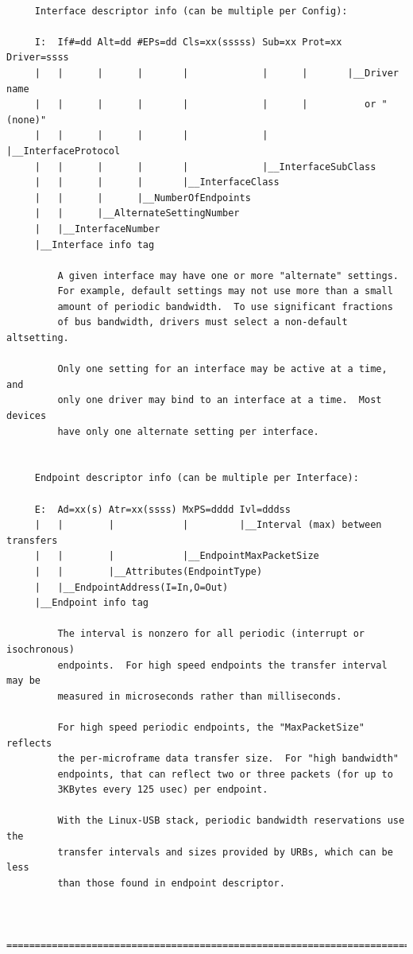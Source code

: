 \begin{verbatim}
     
     Interface descriptor info (can be multiple per Config):
     
     I:  If#=dd Alt=dd #EPs=dd Cls=xx(sssss) Sub=xx Prot=xx Driver=ssss
     |   |      |      |       |             |      |       |__Driver name
     |   |      |      |       |             |      |          or "(none)"
     |   |      |      |       |             |      |__InterfaceProtocol
     |   |      |      |       |             |__InterfaceSubClass
     |   |      |      |       |__InterfaceClass
     |   |      |      |__NumberOfEndpoints
     |   |      |__AlternateSettingNumber
     |   |__InterfaceNumber
     |__Interface info tag
     
         A given interface may have one or more "alternate" settings.
         For example, default settings may not use more than a small
         amount of periodic bandwidth.  To use significant fractions
         of bus bandwidth, drivers must select a non-default altsetting.
     
         Only one setting for an interface may be active at a time, and
         only one driver may bind to an interface at a time.  Most devices
         have only one alternate setting per interface.
     
     
     Endpoint descriptor info (can be multiple per Interface):
     
     E:  Ad=xx(s) Atr=xx(ssss) MxPS=dddd Ivl=dddss
     |   |        |            |         |__Interval (max) between transfers
     |   |        |            |__EndpointMaxPacketSize
     |   |        |__Attributes(EndpointType)
     |   |__EndpointAddress(I=In,O=Out)
     |__Endpoint info tag
     
         The interval is nonzero for all periodic (interrupt or isochronous)
         endpoints.  For high speed endpoints the transfer interval may be
         measured in microseconds rather than milliseconds.
     
         For high speed periodic endpoints, the "MaxPacketSize" reflects
         the per-microframe data transfer size.  For "high bandwidth"
         endpoints, that can reflect two or three packets (for up to
         3KBytes every 125 usec) per endpoint.
     
         With the Linux-USB stack, periodic bandwidth reservations use the
         transfer intervals and sizes provided by URBs, which can be less
         than those found in endpoint descriptor.
     
     
     =======================================================================
     

\end{verbatim}
